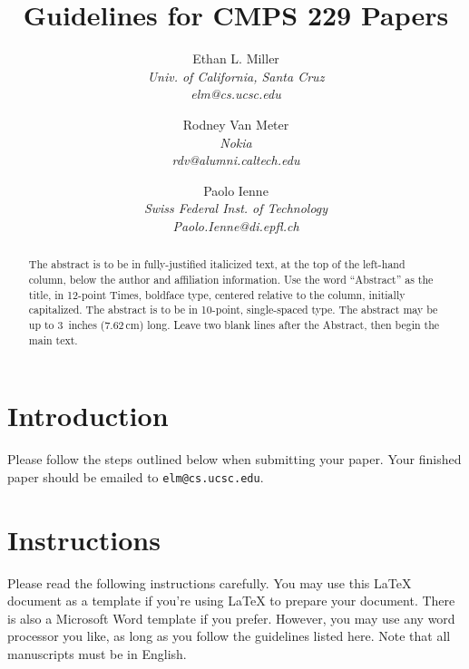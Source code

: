 \documentclass[10pt,twocolumn]{article}
\newcommand{\latex}{\LaTeX\xspace}
\begin{document}
\title{Guidelines for CMPS 229 Papers}

\author{
Ethan L. Miller \\
\textit{Univ. of California, Santa Cruz} \\
\textit{elm@cs.ucsc.edu}
\and
Rodney Van Meter \\
\textit{Nokia} \\
\textit{rdv@alumni.caltech.edu}
\and
Paolo Ienne\\
\textit{Swiss Federal Inst. of Technology} \\
\textit{ Paolo.Ienne@di.epfl.ch} 
}

\maketitle
\thispagestyle{empty}

\begin{abstract}
  The abstract is to be in fully-justified italicized text, at the top
  of the left-hand column, below the author and affiliation
  information. Use the word ``Abstract'' as the title, in 12-point
  Times, boldface type, centered relative to the column, initially
  capitalized. The abstract is to be in 10-point, single-spaced type.
  The abstract may be up to 3~inches (7.62\,cm) long. Leave two blank
  lines after the Abstract, then begin the main text.
\end{abstract}

\section{Introduction}

Please follow the steps outlined below when submitting your paper.  Your
finished paper should be emailed to \verb+elm@cs.ucsc.edu+.

\section{Instructions}

Please read the following instructions carefully.  You may use this
\latex document as a template if you're using \latex to prepare your
document.  There is also a Microsoft Word template if you prefer.
However, you may use any word processor you like, as long as you
follow the guidelines listed here.  Note that all manuscripts must be
in English.
\end{document}
